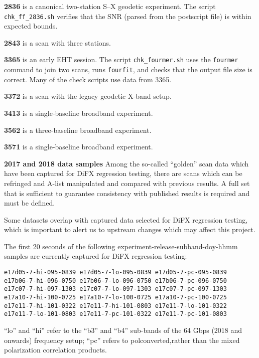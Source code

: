 \begin{description}
\item{\textbf{2836}} is a canonical two-station S--X geodetic experiment. The script \texttt{chk\_ff\_2836.sh} verifies that the SNR (parsed from the postscript file) is within expected bounds.
\item{\textbf{2843}} is a scan with three stations.
\item{\textbf{3365}} is an early \ac{EHT} session. The script \texttt{chk\_fourmer.sh} uses the \texttt{fourmer} command to join two scans, runs \texttt{fourfit}, and checks that the output file size is correct. Many of the check scripts use data from 3365.
\item{\textbf{3372}} is a scan with the legacy geodetic X-band setup.
\item{\textbf{3413}} is a single-baseline broadband experiment.
\item{\textbf{3562}} is a three-baseline broadband experiment.
\item{\textbf{3571}} is a single-baseline broadband experiment.
\item{\textbf{2017 and 2018 data samples}} Among the so-called ``golden'' scan data which have been captured for \acs{DiFX} regression testing, there are scans which can be refringed and \acs{A-list} manipulated and compared with previous results.  A full set that is sufficient to guarantee consistency with published results is required and must be defined.
\end{description}
Some datasets overlap with captured data selected for DiFX regression testing, which is important to alert us to upstream changes which may affect this project.

The first 20 seconds of the following experiment-release-subband-doy-hhmm samples are currently captured for \acs{DiFX} regression testing:
\begin{verbatim}
e17d05-7-hi-095-0839 e17d05-7-lo-095-0839 e17d05-7-pc-095-0839
e17b06-7-hi-096-0750 e17b06-7-lo-096-0750 e17b06-7-pc-096-0750
e17c07-7-hi-097-1303 e17c07-7-lo-097-1303 e17c07-7-pc-097-1303
e17a10-7-hi-100-0725 e17a10-7-lo-100-0725 e17a10-7-pc-100-0725
e17e11-7-hi-101-0322 e17e11-7-hi-101-0803 e17e11-7-lo-101-0322
e17e11-7-lo-101-0803 e17e11-7-pc-101-0322 e17e11-7-pc-101-0803
\end{verbatim}
``lo'' and ``hi'' refer to the ``b3'' and ``b4'' sub-bands of the 64 \acs{Gbps} (2018 and onwards) frequency setup; ``pc'' refers to polconverted,rather than the mixed polarization correlation products.


